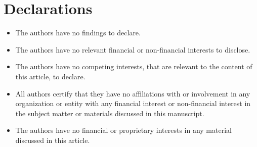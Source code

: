 \documentclass[reqno,openbib,runningheads,a4paper,12pt]{amsart}%
\begin{document}
\section{\textbf{Declarations}}

\begin{itemize}
\item The authors have no findings to declare.

\item The authors have no relevant financial or non-financial interests to disclose.

\item The authors have no competing interests, that are relevant to the
content of this article, to declare.

\item All authors certify that they have no affiliations with or involvement
in any organization or entity with any financial interest or non-financial
interest in the subject matter or materials discussed in this manuscript.

\item The authors have no financial or proprietary interests in any material
discussed in this article.
\end{itemize}

\renewcommand{\refname}{\textbf{REFERENCES}}
\end{document}
